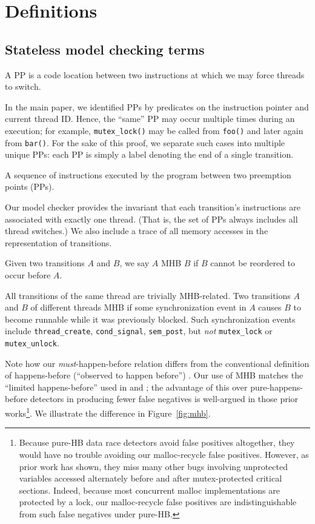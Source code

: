 \section{Definitions}

\subsection{Stateless model checking terms}

\begin{definition}
	A PP is a code location between two instructions at which we may force threads to switch.
\end{definition}

In the main paper, we identified PPs by predicates on the instruction pointer and current thread ID. Hence, the ``same'' PP may occur multiple times during an execution; for example, {\tt mutex\_lock()} may be called from {\tt foo()} and later again from {\tt bar()}.
For the sake of this proof, we separate such cases into multiple unique PPs: each PP is simply a label denoting the end of a single transition.

\begin{definition}[Transition]
A sequence of instructions executed by the program between two preemption points (PPs).
\label{def:transition}
\end{definition}
Our model checker provides the invariant that each transition's instructions are associated with exactly one thread. (That is, the set of PPs always includes all thread switches.)
We also include a trace of all memory accesses in the representation of transitions.

\begin{definition}
	Given two transitions $A$ and $B$, we say $A$ MHB $B$ if $B$ cannot be reordered to occur before $A$.
\end{definition}
All transitions of the same thread are trivially MHB-related.
Two transitions $A$ and $B$ of different threads MHB if some synchronization event in $A$ causes $B$ to become runnable while it was previously blocked. Such synchronization events include {\tt thread\_create}, {\tt cond\_signal}, {\tt sem\_post}, but {\em not} {\tt mutex\_lock} or {\tt mutex\_unlock}.

Note how our {\em must}-happen-before relation differs from the conventional definition of happens-before (``observed to happen before'') \cite{lamport-clocks}.
Our use of MHB matches the ``limited happens-before'' used in \cite{hybriddatarace} and \cite{tsan};
the advantage of this over pure-happens-before detectors in producing fewer false negatives is well-argued in those prior works\footnote{
Because pure-HB data race detectors avoid false positives altogether, they would have no trouble avoiding our malloc-recycle false positives.
However, as prior work has shown, they miss many other bugs involving unprotected variables accessed alternately before and after mutex-protected critical sections.
Indeed, because most concurrent malloc implementations are protected by a lock,
our malloc-recycle false positives are indistinguishable from such false negatives under pure-HB.
}.
We illustrate the difference in Figure~\ref{fig:mhb}.

